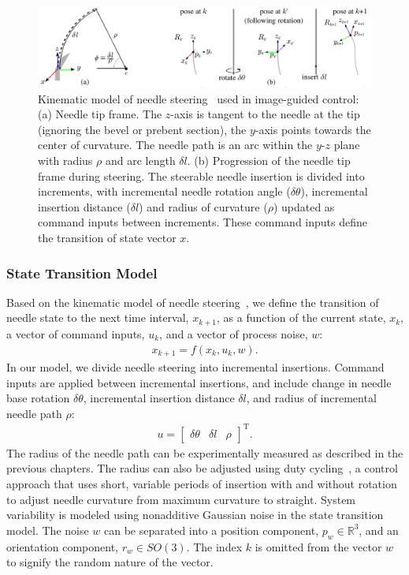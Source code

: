 \begin{figure}[!t]
\centering
\includegraphics[width=\textwidth]{Images/Chapter4/NeedleKinematics/NeedleKinematics}%
\caption[Kinematic model of needle steering used in image-guided control]{Kinematic model of needle steering~\cite{Webster2006} used in image-guided control: (a) Needle tip frame. The $z$-axis is tangent to the needle at the tip (ignoring the bevel or prebent section), the $y$-axis points towards the center of curvature. The needle path is an arc within the $y$-$z$ plane with radius $\rho$ and arc length $\delta l$. (b) Progression of the needle tip frame during steering. The steerable needle insertion is divided into increments, with incremental needle rotation angle ($\delta\theta$), incremental insertion distance ($\delta l$) and radius of curvature ($\rho$) updated as command inputs between increments. These command inputs define the transition of state vector ${x}$.}
\label{fig:NeedleKinematics}
\end{figure}

\subsubsection{State Transition Model}
Based on the kinematic model of needle steering~\cite{Webster2006}, we define the transition of needle state to the next time interval, ${x_{k+1}}$, as a function of the current state, ${x_{k}}$, a vector of command inputs, ${u_{k}}$, and a vector of process noise, ${w}$:
\begin{align}
{x_{k+1}} = f({x_k}, {u_k}, {w}).
\end{align}
In our model, we divide needle steering into incremental insertions. Command inputs are applied between incremental insertions, and include change in needle base rotation $\delta\theta$, incremental insertion distance $\delta l$, and radius of incremental needle path $\rho$:
\begin{align}
{u} = \begin{bmatrix} \delta\theta & \delta l & \rho\end{bmatrix}^{\text{T}}.
\end{align}
The radius of the needle path can be experimentally measured as described in the previous chapters. The radius can also be adjusted using duty cycling~\cite{Minhas2007}, a control approach that uses short, variable periods of insertion with and without rotation to adjust needle curvature from maximum curvature to straight. System variability is modeled using nonadditive Gaussian noise in the state transition model. The noise ${w}$ can be separated into a position component, ${p_w} \in \mathbb{R}^3$, and an orientation component, ${r_w} \in SO(3)$. The index $k$ is omitted from the vector ${w}$ to signify the random nature of the vector.


